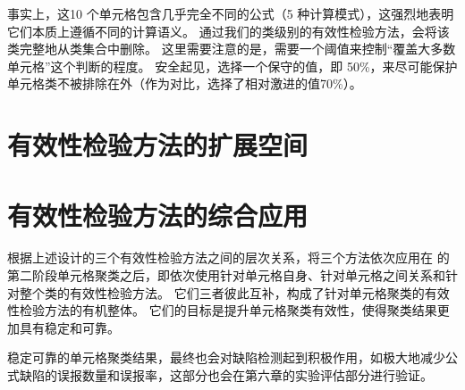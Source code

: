 事实上，这10 个单元格包含几乎完全不同的公式（5 种计算模式），这强烈地表明它们本质上遵循不同的计算语义。
通过我们的类级别的有效性检验方法，\wa 会将该类完整地从类集合中删除。
这里需要注意的是，\wa 需要一个阈值来控制“覆盖大多数单元格”这个判断的程度。
安全起见，\wa 选择一个保守的值，即 50\%，来尽可能保护单元格类不被排除在外（作为对比，\ca 选择了相对激进的值70\%）。


\section{有效性检验方法的扩展空间}


\section{有效性检验方法的综合应用}
根据上述设计的三个有效性检验方法之间的层次关系，\wa 将三个方法依次应用在 \cu 的第二阶段单元格聚类之后，即依次使用针对单元格自身、针对单元格之间关系和针对整个类的有效性检验方法。
它们三者彼此互补，构成了针对单元格聚类的有效性检验方法的有机整体。
它们的目标是提升单元格聚类有效性，使得聚类结果更加具有稳定和可靠。

稳定可靠的单元格聚类结果，最终也会对缺陷检测起到积极作用，如极大地减少公式缺陷的误报数量和误报率，这部分也会在第六章的实验评估部分进行验证。
